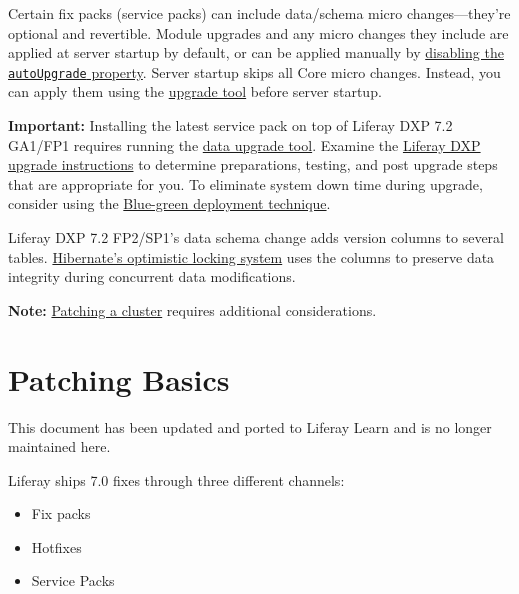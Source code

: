 Certain fix packs (service packs) can include data/schema micro
changes---they're optional and revertible. Module upgrades and any micro
changes they include are applied at server startup by default, or can be
applied manually by
\href{/docs/7-2/deploy/-/knowledge_base/d/configuring-the-data-upgrade\#configuring-non-core-module-data-upgrades}{disabling
the \texttt{autoUpgrade} property}. Server startup skips all Core micro
changes. Instead, you can apply them using the
\href{/docs/7-2/deploy/-/knowledge_base/d/upgrading-to-product-ver}{upgrade
tool} before server startup.

\noindent\hrulefill

\noindent\hrulefill

\textbf{Important:} Installing the latest service pack on top of Liferay
DXP 7.2 GA1/FP1 requires running the
\href{/docs/7-2/deploy/-/knowledge_base/d/upgrading-the-product-data}{data
upgrade tool}. Examine the
\href{/docs/7-2/deploy/-/knowledge_base/d/upgrading-to-product-ver}{Liferay
DXP upgrade instructions} to determine preparations, testing, and post
upgrade steps that are appropriate for you. To eliminate system down
time during upgrade, consider using the
\href{/docs/7-2/deploy/-/knowledge_base/d/other-cluster-update-techniques}{Blue-green
deployment technique}.

Liferay DXP 7.2 FP2/SP1's data schema change adds version columns to
several tables.
\href{https://docs.jboss.org/hibernate/orm/4.0/devguide/en-US/html/ch05.html\#d0e2225}{Hibernate's
optimistic locking system} uses the columns to preserve data integrity
during concurrent data modifications.

\noindent\hrulefill

\noindent\hrulefill

\textbf{Note:}
\href{/docs/7-2/deploy/-/knowledge_base/d/updating-a-cluster}{Patching a
cluster} requires additional considerations.

\chapter{Patching Basics}\label{patching-basics}

{This document has been updated and ported to Liferay Learn and is no
longer maintained here.}

Liferay ships 7.0 fixes through three different channels:

\begin{itemize}
\tightlist
\item
  Fix packs
\item
  Hotfixes
\item
  Service Packs
\end{itemize}

